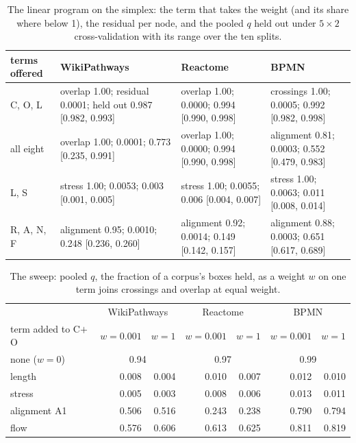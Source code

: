 \documentclass[11pt]{article}
\begin{document}
\begin{table}[!htbp]\centering\small
\begin{tabular}{@{}l>{\raggedright\arraybackslash}p{3.6cm}>{\raggedright\arraybackslash}p{3.6cm}>{\raggedright\arraybackslash}p{3.6cm}@{}}
\toprule
terms offered & WikiPathways & Reactome & BPMN \\
\midrule
C, O, L & overlap 1.00; residual 0.0001; held out 0.987 [0.982, 0.993] & overlap 1.00; 0.0000; 0.994 [0.990, 0.998] & crossings 1.00; 0.0005; 0.992 [0.982, 0.998] \\[2pt]
all eight & overlap 1.00; 0.0001; 0.773 [0.235, 0.991] & overlap 1.00; 0.0000; 0.994 [0.990, 0.998] & alignment 0.81; 0.0003; 0.552 [0.479, 0.983] \\[2pt]
L, S & stress 1.00; 0.0053; 0.003 [0.001, 0.005] & stress 1.00; 0.0055; 0.006 [0.004, 0.007] & stress 1.00; 0.0063; 0.011 [0.008, 0.014] \\[2pt]
R, A, N, F & alignment 0.95; 0.0010; 0.248 [0.236, 0.260] & alignment 0.92; 0.0014; 0.149 [0.142, 0.157] & alignment 0.88; 0.0003; 0.651 [0.617, 0.689] \\
\bottomrule
\end{tabular}
\caption{The linear program on the simplex: the term that takes the weight (and its share
where below 1), the residual per node, and the pooled $q$ held out under $5 \times 2$
cross-validation with its range over the ten splits.}
\label{tab:fit}
\end{table}

\begin{table}[!htbp]\centering\small
\begin{tabular}{lrrrrrr}
\toprule
 & \multicolumn{2}{c}{WikiPathways} & \multicolumn{2}{c}{Reactome} & \multicolumn{2}{c}{BPMN} \\
term added to C$+$O & $w{=}0.001$ & $w{=}1$ & $w{=}0.001$ & $w{=}1$ & $w{=}0.001$ & $w{=}1$ \\
\midrule
none ($w = 0$) & \multicolumn{2}{c}{0.94} & \multicolumn{2}{c}{0.97} & \multicolumn{2}{c}{0.99} \\
length & 0.008 & 0.004 & 0.010 & 0.007 & 0.012 & 0.010 \\
stress & 0.005 & 0.003 & 0.008 & 0.006 & 0.013 & 0.011 \\
alignment A1 & 0.506 & 0.516 & 0.243 & 0.238 & 0.790 & 0.794 \\
flow & 0.576 & 0.606 & 0.613 & 0.625 & 0.811 & 0.819 \\
\bottomrule
\end{tabular}
\caption{The sweep: pooled $q$, the fraction of a corpus's boxes held, as a weight $w$ on
one term joins crossings and overlap at equal weight.}
\label{tab:sweep}
\end{table}
\end{document}
